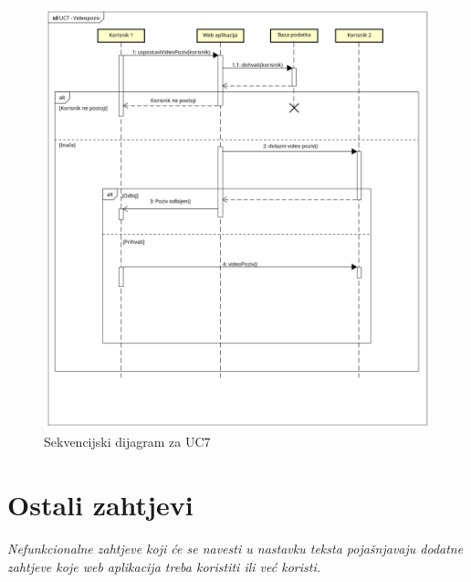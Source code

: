 				\begin{figure}[H]
					\includegraphics[scale= 0.5]{slike/sekvencijski_dijagramUC7.png}
					\centering
					\caption{Sekvencijski dijagram za UC7}
					\label{fig:Sekvencijski dijagram za UC7}
				\end{figure}
				
				\eject
			
			\section{Ostali zahtjevi}
		
			\textit{Nefunkcionalne zahtjeve koji će se navesti u nastavku teksta pojašnjavaju dodatne zahtjeve koje web aplikacija treba koristiti ili već koristi.}
			
